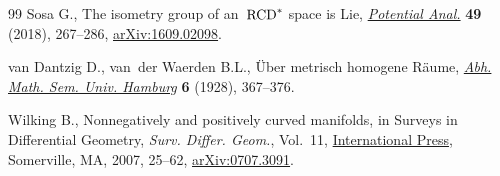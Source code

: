 \documentclass[pdftex]{sigma}
\numberwithin{equation}{section}
\theoremstyle{definition}
\begin{document}
\begin{thebibliography}{99}
Sosa G., The isometry group of an~{${\rm RCD}^*$} space is {L}ie,
 \href{https://doi.org/10.1007/s11118-017-9656-4}{\textit{Potential Anal.}}
 \textbf{49} (2018), 267--286,
 \href{http://arxiv.org/abs/1609.02098}{arXiv:1609.02098}.

van Dantzig D., van~der Waerden B.L., \"Uber metrisch homogene {R}\"aume,
 \href{https://doi.org/10.1007/BF02940622}{\textit{Abh. Math. Sem. Univ.
 Hamburg}} \textbf{6} (1928), 367--376.

Wilking B., Nonnegatively and positively curved manifolds, in Surveys in
 {D}ifferential {G}eometry, \textit{Surv. Differ. Geom.}, Vol.~11,
 \href{https://doi.org/10.4310/SDG.2006.v11.n1.a3}{International Press},
 Somerville, MA, 2007, 25--62,
 \href{http://arxiv.org/abs/0707.3091}{arXiv:0707.3091}.

\end{thebibliography}\LastPageEnding
\end{document}
